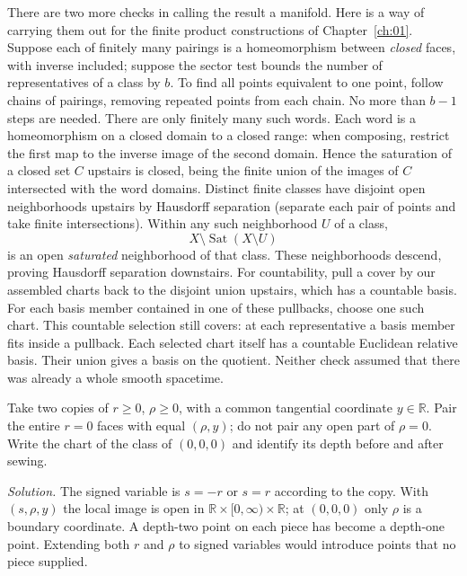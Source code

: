 There are two more checks in calling the result a manifold. Here is a way of carrying them out for the finite product constructions of Chapter~\ref{ch:01}. Suppose each of finitely many pairings is a homeomorphism between \emph{closed} faces, with inverse included; suppose the sector test bounds the number of representatives of a class by $b$. To find all points equivalent to one point, follow chains of pairings, removing repeated points from each chain. No more than $b-1$ steps are needed. There are only finitely many such words. Each word is a homeomorphism on a closed domain to a closed range: when composing, restrict the first map to the inverse image of the second domain. Hence the saturation of a closed set $C$ upstairs is closed, being the finite union of the images of $C$ intersected with the word domains. Distinct finite classes have disjoint open neighborhoods upstairs by Hausdorff separation (separate each pair of points and take finite intersections). Within any such neighborhood $U$ of a class,
\[
 X\setminus\operatorname{Sat}(X\setminus U)
\]
is an open \emph{saturated} neighborhood of that class. These neighborhoods descend, proving Hausdorff separation downstairs. For countability, pull a cover by our assembled charts back to the disjoint union upstairs, which has a countable basis. For each basis member contained in one of these pullbacks, choose one such chart. This countable selection still covers: at each representative a basis member fits inside a pullback. Each selected chart itself has a countable Euclidean relative basis. Their union gives a basis on the quotient. Neither check assumed that there was already a whole smooth spacetime.

\begin{exercise}
Take two copies of $r\geq0$, $\rho\geq0$, with a common tangential coordinate $y\in\mathbb R$. Pair the entire $r=0$ faces with equal $(\rho,y)$; do not pair any open part of $\rho=0$. Write the chart of the class of $(0,0,0)$ and identify its depth before and after sewing.
\end{exercise}
\noindent\emph{Solution.} The signed variable is $s=-r$ or $s=r$ according to the copy. With $(s,\rho,y)$ the local image is open in $\mathbb R\times[0,\infty)\times\mathbb R$; at $(0,0,0)$ only $\rho$ is a boundary coordinate. A depth-two point on each piece has become a depth-one point. Extending both $r$ and $\rho$ to signed variables would introduce points that no piece supplied.




